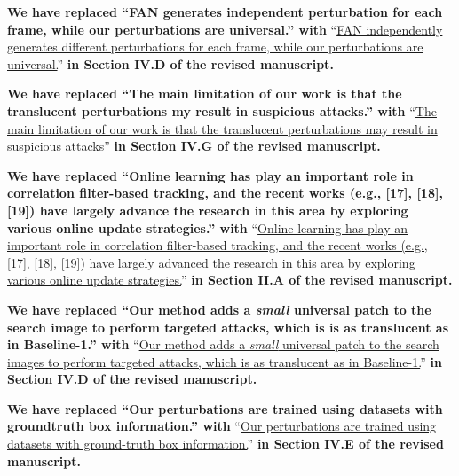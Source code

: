 \documentclass[12pt]{article}
\begin{document}
\textbf{We have replaced ``FAN generates independent perturbation for each frame, while our perturbations are universal.'' with} ``\uline{FAN independently generates different perturbations for each frame, while our perturbations are universal.}'' \textbf{in Section IV.D of the revised manuscript.}

\textbf{We have replaced ``The main limitation of our work is that the translucent perturbations my result in suspicious attacks.'' with} ``\uline{The main limitation of our work is that the translucent perturbations may result in suspicious attacks}'' \textbf{in Section IV.G of the revised manuscript.}

\textbf{We have replaced ``Online learning has play an important role in correlation filter-based tracking, and the recent works (e.g., [17], [18], [19]) have largely advance the research in this area by exploring various online update strategies.'' with} ``\uline{Online learning has play an important role in correlation filter-based tracking, and the recent works (e.g., [17], [18], [19]) have largely advanced the research in this area by exploring various online update strategies.}'' \textbf{in Section II.A of the revised manuscript.}

\textbf{We have replaced ``Our method adds a \textit{small} universal patch to the search image to perform targeted attacks, which is is as translucent as in Baseline-1.'' with} ``\uline{Our method adds a \textit{small} universal patch to the search images to perform targeted attacks, which is as translucent as in Baseline-1.}'' \textbf{in Section IV.D of the revised manuscript.}

\textbf{We have replaced ``Our perturbations are trained using datasets with groundtruth box information.'' with} ``\uline{Our perturbations are trained using datasets with ground-truth box information.}'' \textbf{in Section IV.E of the revised manuscript.}
\end{document}
